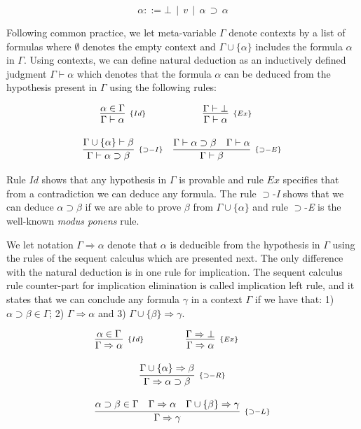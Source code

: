 \[\alpha ::= \bot \,\mid\,v\,\mid\,\alpha\,\supset\,\alpha\]



Following common practice, we let meta-variable $\Gamma$ denote contexts by a list of formulas where $\emptyset$ denotes
the empty context and $\Gamma \cup \{\alpha\}$ includes the formula $\alpha$ in $\Gamma$. Using contexts, we
can define natural deduction as an inductively defined judgment $\Gamma \vdash \alpha$ which denotes that the
formula $\alpha$ can be deduced from the hypothesis present in $\Gamma$ using the following rules:


\[
\begin{array}{cc}
\infer[_{\{Id\}}]{\Gamma \vdash \alpha}{\alpha \in \Gamma} &
\infer[_{\{Ex\}}]{\Gamma \vdash \alpha}{\Gamma \vdash \bot}\\ \\
\infer[_{\{\supset-I\}}]{\Gamma \vdash \alpha \supset \beta}{\Gamma \cup \{\alpha\} \vdash \beta} &
\infer[_{\{\supset-E\}}]{\Gamma \vdash \beta}{\Gamma \vdash \alpha \supset \beta & \Gamma \vdash \alpha}
\end{array}
\]


Rule $Id$ shows that any hypothesis in $\Gamma$ is provable and rule $Ex$ specifies that from a
contradiction we can deduce any formula. The rule $\supset$-\textit{I} shows that we can deduce $\alpha\supset \beta$
if we are able to prove $\beta$ from $\Gamma\cup\{\alpha\}$ and rule $\supset$-\textit{E} is the well-known
\emph{modus ponens} rule.


We let notation $\Gamma\Rightarrow\alpha$ denote that $\alpha$ is deducible from the hypothesis in $\Gamma$
using the rules of the sequent calculus which are presented next. The only difference with the natural deduction
is in one rule for implication. The sequent calculus rule counter-part for implication elimination is called
implication left rule, and it states that we can conclude any formula $\gamma$ in a context $\Gamma$ if we have
that: 1) $\alpha \supset \beta \in \Gamma$; 2) $\Gamma \Rightarrow \alpha$ and 3) $\Gamma \cup \{\beta\} \Rightarrow \gamma$.

\[
\begin{array}{cc}
\infer[_{\{Id\}}]{\Gamma \Rightarrow \alpha}{\alpha \in \Gamma} &
\infer[_{\{Ex\}}]{\Gamma \Rightarrow \alpha}{\Gamma \Rightarrow \bot}\\ \\
\multicolumn{2}{c}{\infer[_{\{\supset-R\}}]{\Gamma \Rightarrow \alpha \supset \beta}{\Gamma \cup \{\alpha\} \Rightarrow \beta}} \\ \\
\multicolumn{2}{c}{\infer[_{\{\supset-L\}}]{\Gamma \Rightarrow \gamma}{
                                                       \alpha \supset \beta \in
                                                        \Gamma &
                                                        \Gamma \Rightarrow
                                                        \alpha & \Gamma \cup
                                                        \{\beta\}\Rightarrow \gamma}}
\end{array}
\]

